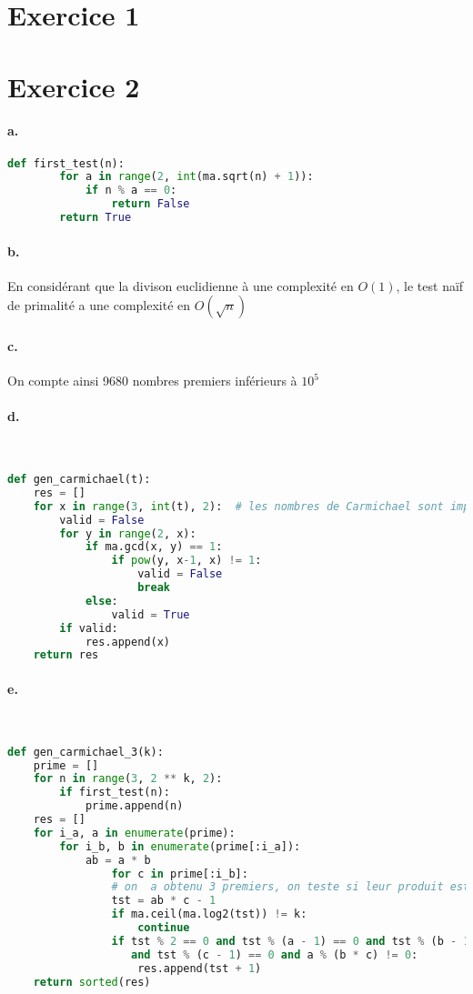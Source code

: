 \documentclass[french]{article}
\begin{document}
\section*{Exercice 1}

\section*{Exercice 2}
\paragraph{a.}  
\begin{center}
\begin{lstlisting}[language=Python, belowskip=-1 \baselineskip]
    def first_test(n):
        for a in range(2, int(ma.sqrt(n) + 1)):
            if n % a == 0:
                return False
        return True
\end{lstlisting}
\end{center}
\paragraph{b.} En considérant que la divison euclidienne à une complexité en $O(1)$, le test naïf de primalité a une complexité en $O(\sqrt{n})$
\paragraph{c.} On compte ainsi 9680 nombres premiers inférieurs à $10^5$

\paragraph{d.} \
\begin{lstlisting}[language=Python, belowskip=-1 \baselineskip]
def gen_carmichael(t):
    res = []
    for x in range(3, int(t), 2):  # les nombres de Carmichael sont impairs
        valid = False
        for y in range(2, x):
            if ma.gcd(x, y) == 1:
                if pow(y, x-1, x) != 1:
                    valid = False
                    break
            else:
                valid = True
        if valid:
            res.append(x)
    return res
\end{lstlisting}

\paragraph{e.} \
\begin{lstlisting}[language=Python, belowskip=-1 \baselineskip]
def gen_carmichael_3(k):
    prime = []
    for n in range(3, 2 ** k, 2):
        if first_test(n):
            prime.append(n)
    res = []
    for i_a, a in enumerate(prime):
        for i_b, b in enumerate(prime[:i_a]):
            ab = a * b
                for c in prime[:i_b]:
                # on  a obtenu 3 premiers, on teste si leur produit est Carmichael
                tst = ab * c - 1
                if ma.ceil(ma.log2(tst)) != k:
                    continue
                if tst % 2 == 0 and tst % (a - 1) == 0 and tst % (b - 1) == 0 
                   and tst % (c - 1) == 0 and a % (b * c) != 0:
                    res.append(tst + 1)
    return sorted(res)
\end{lstlisting}
\end{document}
